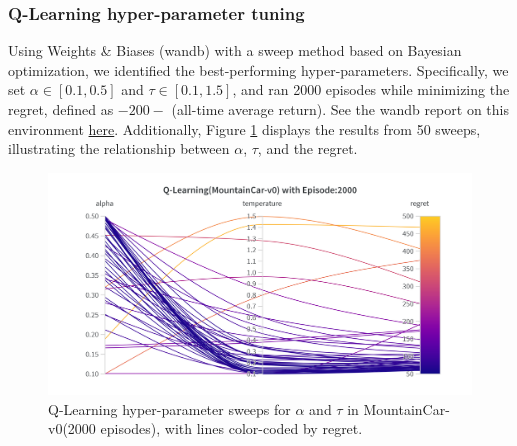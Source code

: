 \documentclass[11pt, a4]{article}
\begin{document}
			\subsubsection{Q-Learning hyper-parameter tuning}
				Using Weights \& Biases (wandb) with a sweep method based on Bayesian optimization, we identified the best-performing hyper-parameters. Specifically, we set $\alpha \in [0.1, 0.5]$ and $\tau \in [0.1, 1.5]$, and ran 2000 episodes while minimizing the regret, defined as \(-200 -\) (all-time average return). See the wandb report on this environment \href{https://wandb.ai/ee24e009-iitm/qlearning_mountain_car-v0tuning/reports/Q-Learning-MountainCar-v0---VmlldzoxMjAxNzEwMQ?accessToken=3ho3ppomqsu6prg4yd4wdhset84tq72p24zrpw8ztwcivdw8xfsjevl6tduvjfi5}{here}. Additionally, Figure \ref{fig:qlearningmountaincar-regret} displays the results from 50 sweeps, illustrating the relationship between $\alpha$, $\tau$, and the regret.
				\begin{figure}[H]
					\centering
					\includegraphics[width=1\linewidth]{qlearning-hyp-tuning-mountaincar.png}
					\caption{Q-Learning hyper-parameter sweeps for $\alpha$ and $\tau$ in MountainCar-v0(2000 episodes), with lines color-coded by regret.}
					\label{fig:qlearningmountaincar-regret}
				\end{figure}
\end{document}
